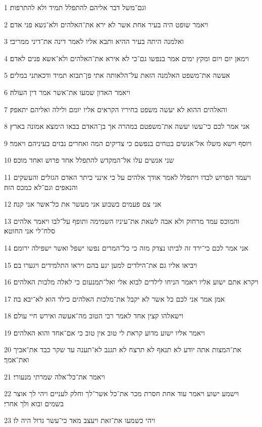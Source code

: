 \par 1 וגם־משל דבר אליהם להתפלל תמיד ולא להתרפות׃
\par 2 ויאמר שופט היה בעיר אחת אשר לא ירא את־האלהים ולא־נשא פני אדם׃
\par 3 ואלמנה היתה בעיר ההיא ותבא אליו לאמר דינה את־דיני ממריבי׃
\par 4 וימאן יום ויום ומקץ ימים אמר בנפשו גם־כי לא אירא את־האלהים ולא־אשא פנים לאדם׃
\par 5 אעשה את־משפט האלמנה הזאת על־הלאותה אתי פן־תבוא תמיד ודכאתני במלים׃
\par 6 ויאמר האדון שמעו את־אשר אמר דין העולה׃
\par 7 והאלהים ההוא לא יעשה משפט בחיריו הקראים אליו יומם ולילה ואליהם יתאפק׃
\par 8 אני אמר לכם כי־עשו יעשה את־משפטם במהרה אך בן־האדם בבאו הימצא אמונה בארץ׃
\par 9 ויוסף וישא משלו אל־אנשים בטחים בנפשם כי צדיקים המה ואחרים נבזים בעיניהם ויאמר׃
\par 10 שני אנשים עלו אל־המקדש להתפלל אחד פרוש ואחד מוכס׃
\par 11 ויעמד הפרוש לבדו ויתפלל לאמר אודך אלהים על כי אינני כיתר האדם הגזלים והעשקים והנאפים וגם־לא כמכס הזה׃
\par 12 אני צם פעמים בשבוע אני מעשר את כל־אשר אני קנה׃
\par 13 והמוכס עמד מרחוק ולא אבה לשאת את־עיניו השמימה ותופף על־לבו ויאמר אלהים סלח־לי אני החוטא׃
\par 14 אני אמר לכם כי־ירד זה לביתו נצדק מזה כי כל־המרים נפשו ישפל ואשר ישפילה ירומם׃
\par 15 ויביאו אליו גם את־הילדים למען יגע בהם ויראו התלמידים ויגערו בם׃
\par 16 ויקרא אתם ישוע אליו ויאמר הניחו לילדים לבוא אלי ואל־תמנעום כי לאלה מלכות האלהים׃
\par 17 אמן אמר אני לכם כל אשר לא יקבל את־מלכות האלהים כילד הוא לא־יבא בה׃
\par 18 וישאלהו קצין אחד לאמר רבי הטוב מה־אעשה ואירש חיי עולם׃
\par 19 ויאמר אליו ישוע מדוע קראת לי טוב אין טוב כי אם־אחד והוא האלהים׃
\par 20 את־המצות אתה יודע לא תנאף לא תרצח לא תגנב לא־תענה עד שקר כבד את־אביך ואת־אמך׃
\par 21 ויאמר את־כל־אלה שמרתי מנעורי׃
\par 22 וישמע ישוע ויאמר עוד אחת חסרת מכר את־כל אשר־לך וחלק לעניים ויהי לך אוצר בשמים ובוא ולך אחרי׃
\par 23 ויהי כשמעו את־זאת ויעצב מאד כי־עשר גדול היה לו׃
